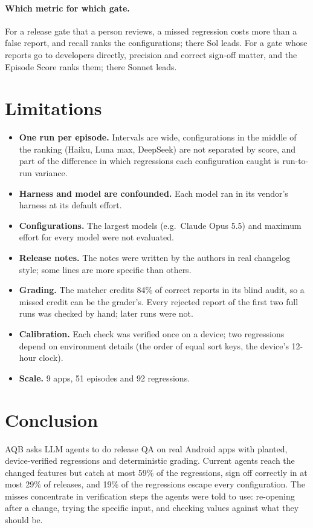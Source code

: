 \documentclass[11pt]{article}
\newcommand{\aqb}{\textsc{AQB}}
\begin{document}
\paragraph{Which metric for which gate.} For a release gate that a person reviews, a missed regression
costs more than a false report, and recall ranks the configurations; there Sol leads. For a gate
whose reports go to developers directly, precision and correct sign-off matter, and the Episode Score
ranks them; there Sonnet leads.

\section{Limitations}
\begin{itemize}
  \item \textbf{One run per episode.} Intervals are wide, configurations in the middle of the ranking
    (Haiku, Luna max, DeepSeek) are not separated by score, and part of the difference in which
    regressions each configuration caught is run-to-run variance.
  \item \textbf{Harness and model are confounded.} Each model ran in its vendor's harness at its
    default effort.
  \item \textbf{Configurations.} The largest models (e.g.\ Claude Opus 5.5) and maximum effort for
    every model were not evaluated.
  \item \textbf{Release notes.} The notes were written by the authors in real changelog style; some
    lines are more specific than others.
  \item \textbf{Grading.} The matcher credits 84\% of correct reports in its blind audit, so a missed
    credit can be the grader's. Every rejected report of the first two full runs was checked by hand;
    later runs were not.
  \item \textbf{Calibration.} Each check was verified once on a device; two regressions depend on
    environment details (the order of equal sort keys, the device's 12-hour clock).
  \item \textbf{Scale.} 9 apps, 51 episodes and 92 regressions.
\end{itemize}

\section{Conclusion}
\aqb{} asks LLM agents to do release QA on real Android apps with planted, device-verified
regressions and deterministic grading. Current agents reach the changed features but catch at most
59\% of the regressions, sign off correctly in at most 29\% of releases, and 19\% of the regressions
escape every configuration. The misses concentrate in verification steps the agents were told to
use: re-opening after a change, trying the specific input, and checking values against what they
should be.
\end{document}
